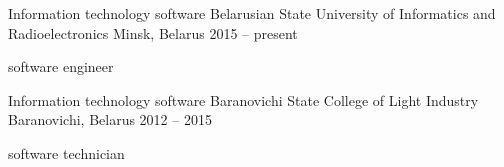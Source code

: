 

\begin{cventries}

  \cventry
    {Information technology software} %
    {Belarusian State University of Informatics and Radioelectronics} %
    {Minsk, Belarus} %
    {2015 – present} %
    {
      \begin{cvitems} %
        \item {software engineer}
      \end{cvitems}
    }

  \cventry
    {Information technology software} %
    {Baranovichi State College of Light Industry} %
    {Baranovichi, Belarus} %
    {2012 – 2015} %
    {
      \begin{cvitems} %
        \item {software technician}
      \end{cvitems}
    }

\end{cventries}
